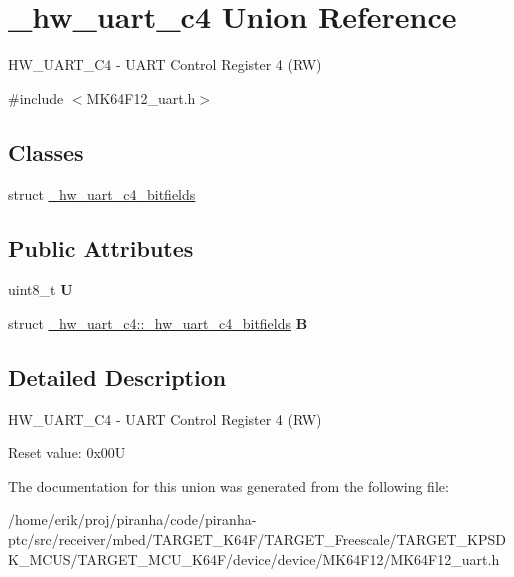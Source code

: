 \hypertarget{union__hw__uart__c4}{}\section{\+\_\+hw\+\_\+uart\+\_\+c4 Union Reference}
\label{union__hw__uart__c4}


H\+W\+\_\+\+U\+A\+R\+T\+\_\+\+C4 -\/ U\+A\+RT Control Register 4 (RW)  




{\ttfamily \#include $<$M\+K64\+F12\+\_\+uart.\+h$>$}

\subsection*{Classes}
\begin{DoxyCompactItemize}
\item 
struct \hyperlink{struct__hw__uart__c4_1_1__hw__uart__c4__bitfields}{\+\_\+hw\+\_\+uart\+\_\+c4\+\_\+bitfields}
\end{DoxyCompactItemize}
\subsection*{Public Attributes}
\begin{DoxyCompactItemize}
\item 
uint8\+\_\+t {\bfseries U}\hypertarget{union__hw__uart__c4_a051142d645921f56a52f3ef6acecfba4}{}\label{union__hw__uart__c4_a051142d645921f56a52f3ef6acecfba4}

\item 
struct \hyperlink{struct__hw__uart__c4_1_1__hw__uart__c4__bitfields}{\+\_\+hw\+\_\+uart\+\_\+c4\+::\+\_\+hw\+\_\+uart\+\_\+c4\+\_\+bitfields} {\bfseries B}\hypertarget{union__hw__uart__c4_a23cf5fc4dda94ee3224a65a48eb62d35}{}\label{union__hw__uart__c4_a23cf5fc4dda94ee3224a65a48eb62d35}

\end{DoxyCompactItemize}


\subsection{Detailed Description}
H\+W\+\_\+\+U\+A\+R\+T\+\_\+\+C4 -\/ U\+A\+RT Control Register 4 (RW) 

Reset value\+: 0x00U 

The documentation for this union was generated from the following file\+:\begin{DoxyCompactItemize}
\item 
/home/erik/proj/piranha/code/piranha-\/ptc/src/receiver/mbed/\+T\+A\+R\+G\+E\+T\+\_\+\+K64\+F/\+T\+A\+R\+G\+E\+T\+\_\+\+Freescale/\+T\+A\+R\+G\+E\+T\+\_\+\+K\+P\+S\+D\+K\+\_\+\+M\+C\+U\+S/\+T\+A\+R\+G\+E\+T\+\_\+\+M\+C\+U\+\_\+\+K64\+F/device/device/\+M\+K64\+F12/M\+K64\+F12\+\_\+uart.\+h\end{DoxyCompactItemize}
